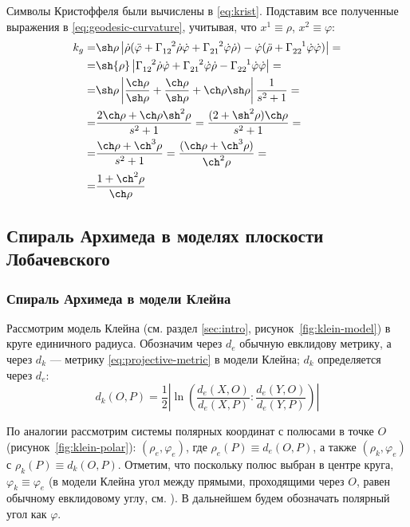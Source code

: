 \documentclass{article}
\numberwithin{equation}{section}
\renewcommand{\phi}{\varphi}
\newcommand{\krist}[3]{\Gamma^{\phantom{#1 #2}#3}_{#1 #2}}
\providecommand{\abs}[1]{\left \lvert{#1}\right \rvert}
\begin{document}
Символы Кристоффеля были вычислены в \eqref{eq:krist}. Подставим все
полученные выражения в \eqref{eq:geodesic-curvature}, учитывая, что
$x^1 \equiv \rho$, $x^2 \equiv \phi$:
\begin{equation}
  \begin{split}
    k_g =& \sh\rho \abs{\dot\rho(\ddot\phi +
      \krist{1}{2}{2}\dot\rho\dot\phi +
      \krist{2}{1}{2}\dot\phi\dot\rho) -
      \dot\phi(\ddot\rho + \krist{2}{2}{1}\dot\phi\dot\phi)} = \\
    =& \sh{\rho} \abs{\krist{1}{2}{2} \dot{\rho} \dot{\phi} +
      \krist{2}{1}{2} \dot{\phi} \dot{\rho} - \krist{2}{2}{1}
      \dot{\phi} \dot {\phi}}= \\
    =& \sh\rho \abs{\frac{\ch\rho}{\sh\rho} +
      \frac{\ch\rho}{\sh\rho} + \ch\rho \sh\rho} \frac{1}{s^2+1} = \\
    =& \frac{2\ch\rho + \ch\rho \sh^2\rho}{s^2+1}
    = \frac{(2+\sh^2\rho)\ch\rho}{s^2+1} = \\
    =& \frac{\ch\rho + \ch^3\rho}{s^2+1} =
    \frac{(\ch\rho+\ch^3\rho)}{\ch^2\rho} = \\
    =& \frac{1 + \ch^2\rho}{\ch\rho}
  \end{split}
\end{equation}

\clearpage
\subsection{Спираль Архимеда в моделях плоскости Лобачевского}

\subsubsection{Спираль Архимеда в модели Клейна}
\label{sec:arch-spiral-klein}

Рассмотрим модель Клейна (см. раздел \ref{sec:intro},
рисунок \ref{fig:klein-model}) в круге единичного радиуса. Обозначим
через $d_e$ обычную евклидову метрику, а через $d_k$ — метрику
\eqref{eq:projective-metric} в модели Клейна; $d_k$ определяется через
$d_e$:
\begin{equation}\label{eq:projective-metric-centered}
  d_k(O,P) = \frac{1}{2}\abs{\ln\left(\frac{d_e(X,O)}{d_e(X,P)}:\frac{d_e(Y,O)}{d_e(Y,P)}\right)}
\end{equation}

По аналогии рассмотрим системы полярных координат с полюсами в точке
$O$ (рисунок \ref{fig:klein-polar}): $(\rho_e, \phi_e)$, где
$\rho_e(P) \equiv d_e(O,P)$, а также $(\rho_k, \phi_e)$ с $\rho_k(P)
\equiv d_k(O, P)$. Отметим, что поскольку полюс выбран в центре круга,
$\phi_k \equiv \phi_e$ (в модели Клейна угол между прямыми,
проходящими через $O$, равен обычному евклидовому углу, см.
\cite{zaslavsky04}). В дальнейшем будем обозначать полярный угол как
$\phi$.
\end{document}
